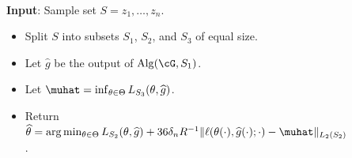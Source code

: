 \documentclass[11pt]{article} %
\theoremstyle{theorem}  %
\theoremstyle{plain}
\newcommand{\wh}[1]{\widehat{#1}}
\newcommand{\estone}{\wh{g}}
\newcommand{\esttwo}{\wh{\theta}}
\newcommand{\nuisance}{\cG}
\newcommand{\target}{\Theta}
\newcommand{\sampleone}{S_1}
\newcommand{\sampletwo}{S_2}
\newcommand{\samplethree}{S_3}
\renewcommand{\hat}[1]{\wh{#1}}
\begin{document}
\begin{figure}[H]
\begin{framedalgorithm}~\\
\textbf{Input}: Sample set $S=z_1,\ldots,z_n$.
\begin{itemize}
\item Split $S$ into subsets $\sampleone$, $\sampletwo$, and $\samplethree$ of equal size.
\item Let $\estone$ be the output of $\mathrm{Alg}(\nuisance,\sampleone)$.
  \item Let $\muhat = \inf_{\theta\in \target} L_{S_3}(\theta, \hat{g})$.
  \item Return $\esttwo = \arg\min_{\theta\in \target} L_{\sampletwo}(\theta, \hat{g}) + 36\delta_nR^{-1}\|\ell(\theta(\cdot),\estone(\cdot);\cdot)-\muhat\|_{L_2(\sampletwo)}$.
\end{itemize}
\label{alg:variance_penalization}
\end{framedalgorithm}
\end{figure}
\end{document}
